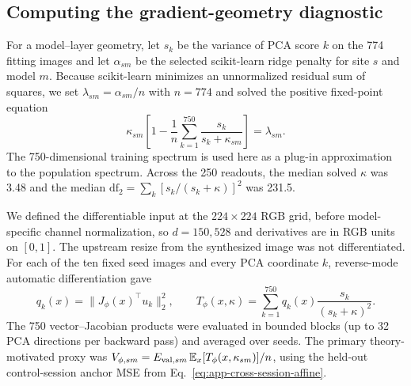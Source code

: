 \subsection{Computing the gradient-geometry diagnostic}
\label{sec:app-methods-nonlinear}
For a model--layer geometry, let $s_k$ be the variance of PCA score $k$ on the
774 fitting images and let $\alpha_{sm}$ be the selected scikit-learn ridge
penalty for site $s$ and model $m$.  Because scikit-learn minimizes an
unnormalized residual sum of squares, we set $\lambda_{sm}=\alpha_{sm}/n$ with
$n=774$ and solved the positive fixed-point equation
\begin{equation}
 \kappa_{sm}\left[1-\frac{1}{n}\sum_{k=1}^{750}
 \frac{s_k}{s_k+\kappa_{sm}}\right]=\lambda_{sm}.
 \label{eq:app-alpha-to-kappa}
\end{equation}
The 750-dimensional training spectrum is used here as a plug-in approximation
to the population spectrum.  Across the 250 readouts, the median solved
$\kappa$ was 3.48 and the median
$\mathrm{df}_2=\sum_k[s_k/(s_k+\kappa)]^2$ was 231.5.

We defined the differentiable input at the $224\times224$ RGB grid, before
model-specific channel normalization, so $d=150{,}528$ and derivatives are in
RGB units on $[0,1]$.  The upstream resize from the synthesized image was not
differentiated.  For each of the ten fixed seed images and every PCA coordinate
$k$, reverse-mode automatic differentiation gave
\begin{equation}
 q_k(x)=\|J_\phi(x)^\top u_k\|_2^2,
 \qquad
 T_\phi(x,\kappa)=\sum_{k=1}^{750}
 q_k(x)\frac{s_k}{(s_k+\kappa)^2}.
 \label{eq:app-neural-trace-computation}
\end{equation}
The 750 vector--Jacobian products were evaluated in bounded blocks (up to 32
PCA directions per backward pass) and averaged over seeds.  The primary
theory-motivated proxy was
$V_{\phi,sm}=E_{{\rm val},sm}\,\mathbb E_x[T_\phi(x,\kappa_{sm})]/n$, using the
held-out control-session anchor MSE from
Eq.~\ref{eq:app-cross-session-affine}.


